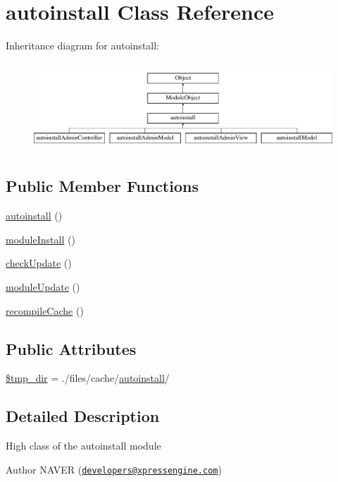 \hypertarget{classautoinstall}{}\section{autoinstall Class Reference}
\label{classautoinstall}
Inheritance diagram for autoinstall\+:\begin{figure}[H]
\begin{center}
\leavevmode
\includegraphics[height=3.353293cm]{classautoinstall}
\end{center}
\end{figure}
\subsection*{Public Member Functions}
\begin{DoxyCompactItemize}
\item 
\hyperlink{classautoinstall_aa76d5fcbf6ac9450b810acefa4b85a51}{autoinstall} ()
\item 
\hyperlink{classautoinstall_ad783aa6031577dca5fdcc7f6ea61f452}{module\+Install} ()
\item 
\hyperlink{classautoinstall_a74f260b0d1254c8e4dbd69b532072a95}{check\+Update} ()
\item 
\hyperlink{classautoinstall_a856f1e61cac8e20ed0df58a6a10f61a8}{module\+Update} ()
\item 
\hyperlink{classautoinstall_a7455962a1f07ea4c4e28971fa8dde715}{recompile\+Cache} ()
\end{DoxyCompactItemize}
\subsection*{Public Attributes}
\begin{DoxyCompactItemize}
\item 
\hyperlink{classautoinstall_a157882a0b8cc81818aa516880f2ba5dc}{\$tmp\+\_\+dir} = \textquotesingle{}./files/cache/\hyperlink{classautoinstall}{autoinstall}/\textquotesingle{}
\end{DoxyCompactItemize}


\subsection{Detailed Description}
High class of the autoinstall module \begin{DoxyAuthor}{Author}
N\+A\+V\+ER (\href{mailto:developers@xpressengine.com}{\tt developers@xpressengine.\+com}) 
\end{DoxyAuthor}


